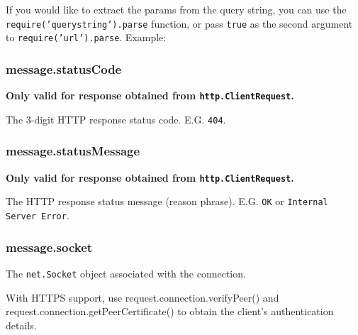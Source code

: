 If you would like to extract the params from the query string, you can
use the \texttt{require('querystring').parse} function, or pass
\texttt{true} as the second argument to \texttt{require('url').parse}.
Example:

\begin{Shaded}
\begin{Highlighting}[]
\NormalTok{(}\NormalTok{(}\NormalTok{, }\NormalTok{)}
\NormalTok{\{ }\NormalTok{: }\NormalTok{,}
  \NormalTok{: }\NormalTok{,}
  \NormalTok{: \{ }\NormalTok{: } \NormalTok{\},}
  \NormalTok{: } \NormalTok{\}}
\end{Highlighting}
\end{Shaded}

\subsubsection{message.statusCode}\label{message.statuscode}

\textbf{Only valid for response obtained from
\texttt{http.ClientRequest}.}

The 3-digit HTTP response status code. E.G. \texttt{404}.

\subsubsection{message.statusMessage}\label{message.statusmessage}

\textbf{Only valid for response obtained from
\texttt{http.ClientRequest}.}

The HTTP response status message (reason phrase). E.G. \texttt{OK} or
\texttt{Internal Server Error}.

\subsubsection{message.socket}\label{message.socket}

The \texttt{net.Socket} object associated with the connection.

With HTTPS support, use request.connection.verifyPeer() and
request.connection.getPeerCertificate() to obtain the client's
authentication details.
